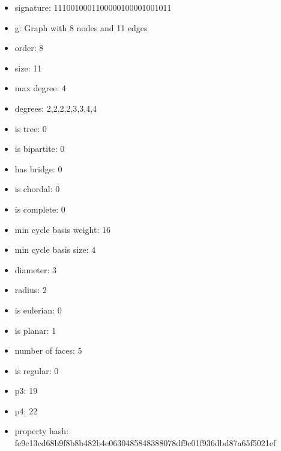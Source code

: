 \begin{itemize}
\item signature: 1110010001100000100001001011
\item g: Graph with 8 nodes and 11 edges
\item order: 8
\item size: 11
\item max degree: 4
\item degrees: 2,2,2,2,3,3,4,4
\item is tree: 0
\item is bipartite: 0
\item has bridge: 0
\item is chordal: 0
\item is complete: 0
\item min cycle basis weight: 16
\item min cycle basis size: 4
\item diameter: 3
\item radius: 2
\item is eulerian: 0
\item is planar: 1
\item number of faces: 5
\item is regular: 0
\item p3: 19
\item p4: 22
\item property hash: fe9c13cd68b9f8b8b482b4e0630485848388078df9c01f936dbd87a65f5021ef
\end{itemize}
\newpage
\begin{figure}
\end{figure}
